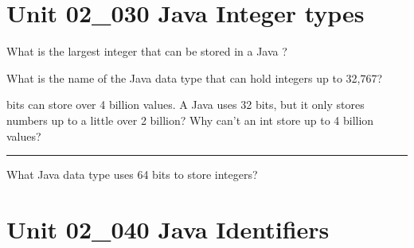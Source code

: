 \documentclass[letterpaper,12pt]{exam}
\newcommand{\unit}{Unit 02}
\begin{document}
\begin{questions}
\section*{\unit\_030 Java Integer types} %
\begin{samepage}
	\question What is the largest integer that can be stored in a Java ?
	\vspace{5mm}
\end{samepage}
\begin{samepage}
	\question What is the name of the Java data type that can hold integers up to 32,767?
	\vspace{5mm}
\end{samepage}

\begin{samepage}
	 bits can store over 4 billion values.  A Java  uses 32 bits, but it only stores numbers up to a little over 2 billion?  Why can't an int store up to 4 billion values?
	\vspace{5mm}
\end{samepage}

\hrule
\vspace{5mm}

\begin{samepage}
	\question What Java data type uses 64 bits to store integers?
	\vspace{5mm}
\end{samepage}

\section*{\unit\_040 Java Identifiers} %


\end{questions}
\end{document}
